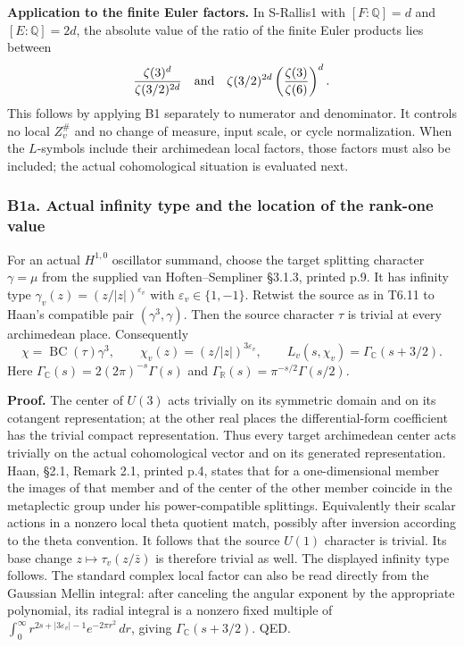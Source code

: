 \textbf{Application to the finite Euler factors.} In S-Rallis1 with \([F:\mathbb Q]=d\) and \([E:\mathbb Q]=2d\), the absolute value of the ratio of the finite Euler products lies between \[
 \frac{\zeta(3)^d}{\zeta(3/2)^{2d}}
 \quad\hbox{and}\quad
 \zeta(3/2)^{2d}\left(\frac{\zeta(3)}{\zeta(6)}\right)^d.
\] This follows by applying B1 separately to numerator and denominator. It controls no local \(Z_v^\#\) and no change of measure, input scale, or cycle normalization. When the \(L\)-symbols include their archimedean local factors, those factors must also be included; the actual cohomological situation is evaluated next.

\subsubsection{B1a. Actual infinity type and the location of the rank-one value}\label{b1a.-actual-infinity-type-and-the-location-of-the-rank-one-value}

For an actual \(H^{1,0}\) oscillator summand, choose the target splitting character \(\gamma=\mu\) from the supplied van Hoften--Sempliner §3.1.3, printed p.9. It has infinity type \(\gamma_v(z)=(z/|z|)^{\varepsilon_v}\) with \(\varepsilon_v\in\{1,-1\}\). Retwist the source as in T6.11 to Haan's compatible pair \((\gamma^3,\gamma)\). Then the source character \(\tau\) is trivial at every archimedean place. Consequently \[
 \chi=\operatorname{BC}(\tau)\gamma^3,
 \qquad \chi_v(z)=(z/|z|)^{3\varepsilon_v},
 \qquad L_v(s,\chi_v)=\Gamma_{\mathbb C}(s+3/2).
\tag{B1a.1}
\] Here \(\Gamma_{\mathbb C}(s)=2(2\pi)^{-s}\Gamma(s)\) and \(\Gamma_{\mathbb R}(s)=\pi^{-s/2}\Gamma(s/2)\).

\textbf{Proof.} The center of \(U(3)\) acts trivially on its symmetric domain and on its cotangent representation; at the other real places the differential-form coefficient has the trivial compact representation. Thus every target archimedean center acts trivially on the actual cohomological vector and on its generated representation. Haan, §2.1, Remark 2.1, printed p.4, states that for a one-dimensional member the images of that member and of the center of the other member coincide in the metaplectic group under his power-compatible splittings. Equivalently their scalar actions in a nonzero local theta quotient match, possibly after inversion according to the theta convention. It follows that the source \(U(1)\) character is trivial. Its base change \(z\mapsto\tau_v(z/\bar z)\) is therefore trivial as well. The displayed infinity type follows. The standard complex local factor can also be read directly from the Gaussian Mellin integral: after canceling the angular exponent by the appropriate polynomial, its radial integral is a nonzero fixed multiple of \(\int_0^\infty r^{2s+|3\varepsilon_v|-1}e^{-2\pi r^2}\,dr\), giving \(\Gamma_{\mathbb C}(s+3/2)\). QED.

